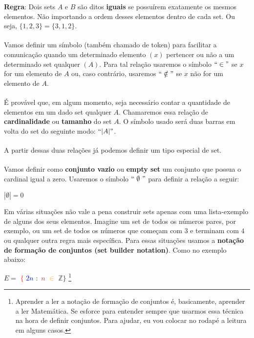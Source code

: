 \documentclass[main.tex]{subfiles}
\begin{document}
\textbf{Regra}: Dois sets $A$ e $B$ são ditos \textbf{iguais} se possuírem exatamente os mesmos elementos. Não importando a ordem desses elementos dentro de cada set. Ou seja, $ \{ 1,2,3 \} = \{3,1,2\}$.
\\~\\
Vamos definir um símbolo (também chamado de token) para facilitar a comunicação quando um determinado elemento $(x)$ pertencer ou não a um determinado set qualquer $(A)$. Para tal relação usaremos o símbolo $``\in"$ se $x$ for um elemento de $A$ ou, caso contrário, usaremos $``\notin"$ se $x$ não for um elemento de $A$.
\\~\\
É provável que, em algum momento, seja necessário contar a quantidade de elementos em um dado set qualquer $A$. Chamaremos essa relação de \textbf{cardinalidade} ou \textbf{tamanho} do set $A$. O símbolo usado será duas barras em volta do set do seguinte modo: $``|A|"$.
\\~\\
A partir dessas duas relações já podemos definir um tipo especial de set.
\\~\\
Vamos definir como \textbf{conjunto vazio} ou \textbf{empty set} um conjunto que possua o cardinal igual a zero. Usaremos o símbolo $`` \ \emptyset \ "$ para definir a relação a seguir:

\begin{center}
	$|\emptyset| = 0$
\end{center}

Em várias situações não vale a pena construir sets apenas com uma lista-exemplo de alguns dos seus elementos. Imagine um set de todos os números pares, por exemplo, ou um set de todos os números que começam com $3$ e terminam com $4$ ou qualquer outra regra mais específica. Para essas situações usamos a \textbf{notação de formação de conjuntos (set builder notation)}. Como no exemplo abaixo:

\begin{center}
	$ E = $ \textcolor{red}{$\{$} \textcolor{blue}{$2n$} \textcolor{OliveGreen}{$:$} \textcolor{Brown}{$n$} \textcolor{Orange}{$\in$} $\mathbb{Z} \} $ \footnote{Aprender a ler a notação de formação de conjuntos é, basicamente, aprender a ler Matemática. Se esforce para entender sempre que usarmos essa técnica na hora de definir conjuntos. Para ajudar, eu vou colocar no rodapé a leitura em alguns casos.}
\end{center}
\end{document}
